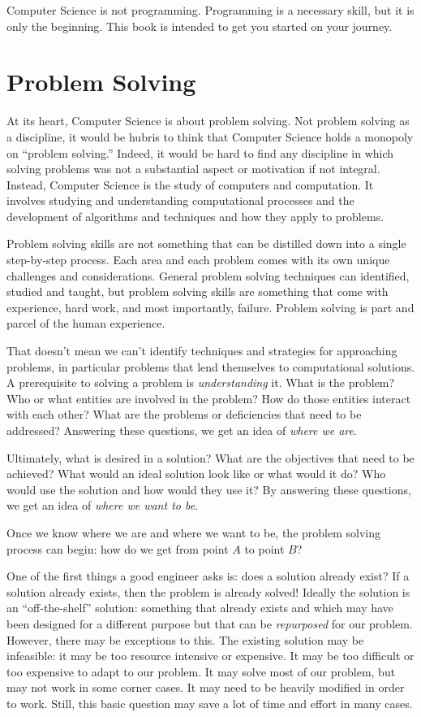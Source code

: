 Computer Science is not programming.  Programming is a necessary skill, but
it is only the beginning.  This book is intended to get you started
on your journey.

\section{Problem Solving}

At its heart, Computer Science is about problem solving.  Not problem solving
as a discipline, it would be hubris to think that Computer Science holds a 
monopoly on ``problem solving.''  Indeed, it would be hard to find any 
discipline in which solving problems was not a substantial aspect or 
motivation if not integral.  Instead, Computer Science is the study of
computers and computation.  It involves studying and understanding 
computational processes and the development of algorithms and techniques 
and how they apply to problems.

Problem solving skills are not something that can be distilled down into 
a single step-by-step process.  Each area and each problem comes with
its own unique challenges and considerations.  General problem solving 
techniques can identified, studied and taught, but problem solving skills 
are something that come with experience, hard work, and most importantly, 
failure.  Problem solving is part and parcel of the human experience.  

That doesn't mean we can't identify techniques and strategies for
approaching problems, in particular problems that lend themselves to
computational solutions.  A prerequisite to solving a problem is 
\emph{understanding} it.  What is the problem?  Who or what entities
are involved in the problem?  How do those entities interact with each
other?  What are the problems or deficiencies that need to be addressed?
Answering these questions, we get an idea of \emph{where we are}.

Ultimately, what is desired in a solution?  What are the objectives that
need to be achieved?  What would an ideal solution look like or what
would it do?  Who would use the solution and how would they use it?
By answering these questions, we get an idea of \emph{where we want to be}.

Once we know where we are and where we want to be, the problem solving
process can begin: how do we get from point $A$ to point $B$?

One of the first things a good engineer asks is: does a solution already exist?
If a solution already exists, then the problem is already solved!  Ideally the
solution is an ``off-the-shelf'' solution: something that already exists 
and which may have been designed for a different purpose but that can
be \emph{repurposed} for our problem.  However, there may be exceptions
to this.  The existing solution may be infeasible: it may be too resource
intensive or expensive.  It may be too difficult or too expensive to adapt
to our problem.  It may solve most of our problem, but may not work in
some corner cases.  It may need to be heavily modified in order to
work.  Still, this basic question may save a lot of time and effort in many
cases.  

